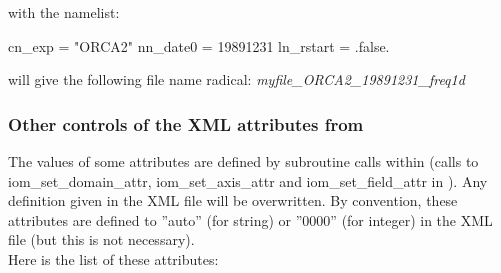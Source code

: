 \documentclass[../main/NEMO_manual]{subfiles}
\begin{document}
\noindent with the namelist:
\begin{forlines}
cn_exp    = "ORCA2"
nn_date0  = 19891231
ln_rstart = .false.
\end{forlines}

\noindent will give the following file name radical: \textit{myfile\_ORCA2\_19891231\_freq1d}

\subsubsection{Other controls of the XML attributes from \NEMO}

The values of some attributes are defined by subroutine calls within \NEMO
(calls to iom\_set\_domain\_attr, iom\_set\_axis\_attr and iom\_set\_field\_attr in ).
Any definition given in the XML file will be overwritten.
By convention, these attributes are defined to ''auto'' (for string) or ''0000'' (for integer) in the XML file
(but this is not necessary).
\\

Here is the list of these attributes:
\\
\end{document}
